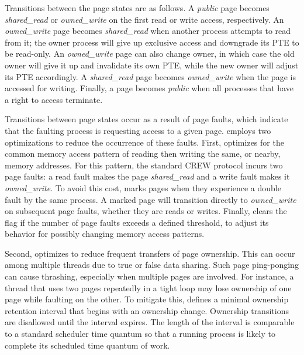 \begin{figure}[t]
\begin{center}
\begin{tabular}{lll|l}
    \hline	

  \end{tabular}
  \end{center}

  \vskip -5mm
  \label{scribe:fig:rendezvous}
  \vskip -2mm
\end{figure}

Transitions between the page states are as follows. A {\em public} page
becomes {\em shared\_read} or {\em owned\_write} on the first read or
write access, respectively. An {\em owned\_write} page becomes {\em
shared\_read} when another process attempts to read from it; the owner
process will give up exclusive access and downgrade its PTE to be
read-only. An {\em owned\_write} page can also change owner, in which
case the old owner will give it up and invalidate its own PTE, while
the new owner will adjust its PTE accordingly. A {\em shared\_read}
page becomes {\em owned\_write} when the page is accessed for writing.
Finally, a page becomes {\em public} when all processes that have a
right to access terminate.  

Transitions between page states occur as a result of page faults,
which indicate that the faulting process is requesting access to a
given page.  \scribe{} employs two optimizations to reduce the
occurrence of these faults.  First, \scribe{} optimizes for the
common memory access pattern of reading then writing the same, or
nearby, memory addresses.  For this pattern, the standard CREW protocol
incurs two page faults: a read fault makes the page {\em shared\_read}
and a write fault makes it {\em owned\_write}. To avoid this cost,
\scribe{} marks pages when they experience a double fault by the same
process. A marked page will transition directly to {\em owned\_write}
on subsequent page faults, whether they are reads or writes. Finally,
\scribe{} clears the flag if the number of page faults exceeds a defined
threshold, to adjust its behavior for possibly changing memory access
patterns.  

Second, \scribe{} optimizes to reduce frequent transfers of page
ownership.  This can occur among multiple threads due to true or
false data sharing.  Such page ping-ponging can cause 
thrashing, especially when multiple pages are involved.  For instance,
a thread that uses two pages repeatedly in a tight loop may
lose ownership of one page while faulting on the other. To
mitigate this, \scribe{} defines a minimal ownership retention
interval that begins with an ownership change.  Ownership transitions
are disallowed until the interval expires.
The length
of the interval is comparable to a standard scheduler time quantum so
that a running process is likely to
complete its scheduled
time quantum of work.

